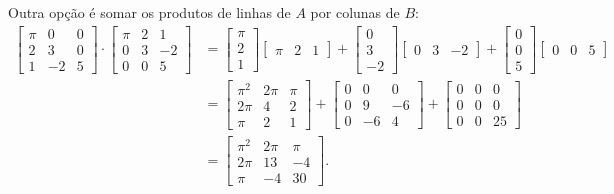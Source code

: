 \documentclass[12pt,a4paper]{article}
\begin{document}
\begin{enumerate}
\begin{enumerate}
Outra opção é somar os produtos de linhas de $A$ por colunas de $B$:
\begin{align*}
\begin{bmatrix}
\pi & 0 & 0 \\
  2 & 3 & 0 \\
  1 & -2 & 5
\end{bmatrix}
\cdot
\begin{bmatrix}
\pi & 2 & 1 \\
 0 & 3 & -2 \\
 0 & 0 & 5
\end{bmatrix}
& =
\begin{bmatrix}
\pi \\
  2\\
  1
\end{bmatrix}
\begin{bmatrix}
\pi & 2 & 1
\end{bmatrix}
+
\begin{bmatrix}
0\\
3\\
-2
\end{bmatrix}
\begin{bmatrix}
  0 & 3 & -2
\end{bmatrix}
+
\begin{bmatrix}
0 \\
0 \\
5
\end{bmatrix}
\begin{bmatrix}
0 & 0 & 5
\end{bmatrix} \\
& =
\begin{bmatrix}
\pi^2 & 2\pi & \pi \\
 2\pi & 4 & 2 \\
  \pi & 2 & 1
\end{bmatrix}
+
\begin{bmatrix}
0 & 0 & 0 \\
0 & 9 & -6 \\
0 & -6 & 4
\end{bmatrix}
+
\begin{bmatrix}
0 & 0 & 0 \\
0 & 0 & 0 \\
0 & 0 & 25
\end{bmatrix}\\
& =
\begin{bmatrix}
\pi^2 & 2\pi & \pi \\
2\pi & 13 & -4 \\
\pi & -4 & 30 
\end{bmatrix}.
\end{align*}


\end{enumerate}
\end{enumerate}
\end{document}
